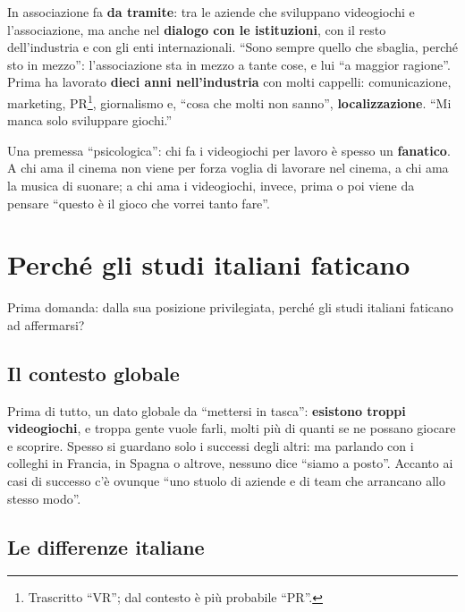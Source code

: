 In associazione fa \textbf{da tramite}: tra le aziende che sviluppano videogiochi e
l'associazione, ma anche nel \textbf{dialogo con le istituzioni}, con il resto
dell'industria e con gli enti internazionali. ``Sono sempre quello che sbaglia,
perché sto in mezzo'': l'associazione sta in mezzo a tante cose, e lui ``a maggior
ragione''. Prima ha lavorato \textbf{dieci anni nell'industria} con molti
cappelli: comunicazione, marketing, PR\footnote{Trascritto ``VR''; dal contesto è
più probabile ``PR''.}, giornalismo e, ``cosa che molti non sanno'',
\textbf{localizzazione}. ``Mi manca solo sviluppare giochi.''

Una premessa ``psicologica'': chi fa i videogiochi per lavoro è spesso un
\textbf{fanatico}. A chi ama il cinema non viene per forza voglia di lavorare nel
cinema, a chi ama la musica di suonare; a chi ama i videogiochi, invece, prima o
poi viene da pensare ``questo è il gioco che vorrei tanto fare''.

\section{Perché gli studi italiani faticano}
\label{sec:c2-3-cause}

Prima domanda: dalla sua posizione privilegiata, perché gli studi italiani
faticano ad affermarsi?

\subsection{Il contesto globale}

Prima di tutto, un dato globale da ``mettersi in tasca'': \textbf{esistono troppi
videogiochi}, e troppa gente vuole farli, molti più di quanti se ne possano
giocare e scoprire. Spesso si guardano solo i successi degli altri: ma parlando con
i colleghi in Francia, in Spagna o altrove, nessuno dice ``siamo a posto''. Accanto
ai casi di successo c'è ovunque ``uno stuolo di aziende e di team che arrancano
allo stesso modo''.

\subsection{Le differenze italiane}

